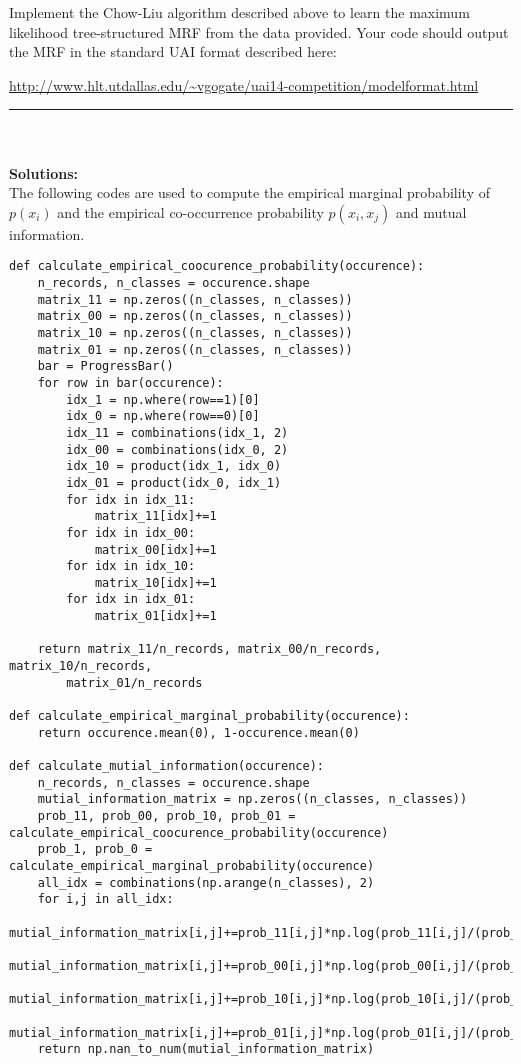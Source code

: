 \documentclass{article}
\begin{document}
\begin{enumerate}

Implement the Chow-Liu algorithm described above to learn the maximum
likelihood tree-structured MRF from the data provided. Your code should output the MRF in the standard UAI format described here:
\begin{center}
\url{http://www.hlt.utdallas.edu/~vgogate/uai14-competition/modelformat.html}
\end{center}
\noindent\rule{14cm}{2pt}
\\
\\
\textbf{Solutions:}
\\
The following codes are used to compute the empirical marginal probability of $p(x_i)$ and the empirical co-occurrence probability  $p(x_i, x_j)$ and mutual information.
\begin{verbatim}
def calculate_empirical_coocurence_probability(occurence):
    n_records, n_classes = occurence.shape
    matrix_11 = np.zeros((n_classes, n_classes))
    matrix_00 = np.zeros((n_classes, n_classes))
    matrix_10 = np.zeros((n_classes, n_classes))
    matrix_01 = np.zeros((n_classes, n_classes))
    bar = ProgressBar()
    for row in bar(occurence):
        idx_1 = np.where(row==1)[0]
        idx_0 = np.where(row==0)[0]
        idx_11 = combinations(idx_1, 2)
        idx_00 = combinations(idx_0, 2)
        idx_10 = product(idx_1, idx_0)
        idx_01 = product(idx_0, idx_1)
        for idx in idx_11:
            matrix_11[idx]+=1
        for idx in idx_00:
            matrix_00[idx]+=1
        for idx in idx_10:
            matrix_10[idx]+=1
        for idx in idx_01:
            matrix_01[idx]+=1
            
    return matrix_11/n_records, matrix_00/n_records, matrix_10/n_records, 
    	matrix_01/n_records

def calculate_empirical_marginal_probability(occurence):
    return occurence.mean(0), 1-occurence.mean(0)

def calculate_mutial_information(occurence):
    n_records, n_classes = occurence.shape
    mutial_information_matrix = np.zeros((n_classes, n_classes))
    prob_11, prob_00, prob_10, prob_01 = calculate_empirical_coocurence_probability(occurence)
    prob_1, prob_0 = calculate_empirical_marginal_probability(occurence)
    all_idx = combinations(np.arange(n_classes), 2)
    for i,j in all_idx:
        mutial_information_matrix[i,j]+=prob_11[i,j]*np.log(prob_11[i,j]/(prob_1[i]*prob_1[j]))
        mutial_information_matrix[i,j]+=prob_00[i,j]*np.log(prob_00[i,j]/(prob_0[i]*prob_0[j]))
        mutial_information_matrix[i,j]+=prob_10[i,j]*np.log(prob_10[i,j]/(prob_1[i]*prob_0[j]))
        mutial_information_matrix[i,j]+=prob_01[i,j]*np.log(prob_01[i,j]/(prob_0[i]*prob_1[j]))
    return np.nan_to_num(mutial_information_matrix)
\end{verbatim}


\end{enumerate}
\end{document}
